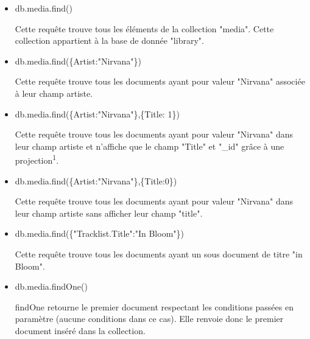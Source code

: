 \begin{itemize}
        \item \begin{tt} db.media.find() \end{tt} \newline
        Cette requête trouve tous les éléments de la collection "media". Cette collection appartient à la base de donnée "library".

        \item \begin{tt} db.media.find(\{Artist:"Nirvana"\}) \end{tt} \newline
        Cette requête trouve tous les documents ayant pour valeur "Nirvana" associée à leur champ artiste.
        
        \item \begin{tt} db.media.find(\{Artist:"Nirvana"\},\{Title: 1\}) \end{tt} \newline
        Cette requête trouve tous les documents ayant pour valeur "Nirvana" dans leur champ artiste et n'affiche que le champ "Title" et "\_id" grâce à une projection\textsuperscript{1}.
        
        \item \begin{tt} db.media.find(\{Artist:"Nirvana"\},\{Title:0\}) \end{tt} \newline
        Cette requête trouve tous les documents ayant pour valeur "Nirvana" dans leur champ artiste sans afficher leur champ "title".
        
        \item \begin{tt} db.media.find(\{"Tracklist.Title":"In Bloom"\}) \end{tt} \newline
        Cette requête trouve tous les documents ayant un sous document de titre "in Bloom".

        \item \begin{tt} db.media.findOne() \end{tt} \newline
        findOne retourne le premier document respectant les conditions passées en paramètre (aucune conditions dans ce cas). Elle renvoie donc le premier document inséré dans la collection.

    \end{itemize}
    
